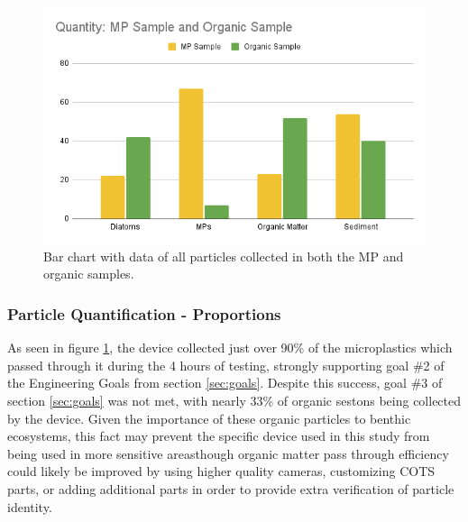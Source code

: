 \documentclass[fleqn,10pt]{SelfArx} %
\begin{document}
	\begin{figure}[h]
		\centering
		\includegraphics[width=1\linewidth]{Figures/MPOrganicCounting}
		\caption[Collected Particle Classification]{Bar chart with data of all particles collected in both the MP and organic samples.}
		\label{fig:mpcounting}
	\end{figure}
	

	
	\subsubsection{Particle Quantification - Proportions}
	As seen in figure \ref{fig:mpcounting}, the device collected just over 90\% of the microplastics which passed through it during the 4 hours of testing, strongly supporting goal \#2 of the Engineering Goals from section \ref{sec:goals}. Despite this success, goal \#3 of section \ref{sec:goals} was not met, with nearly 33\% of organic \glspl{seston} being collected by the device. Given the importance of these organic particles to \gls{benthic} ecosystems, this fact may prevent the specific device used in this study from being used in more sensitive areas\textemdash though organic matter pass through efficiency could likely be improved by using higher quality cameras, customizing COTS parts, or adding additional parts in order to provide extra verification of particle identity.
	
\end{document}
